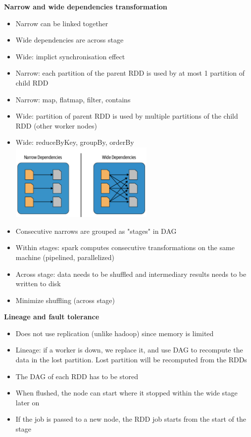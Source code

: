 \documentclass[10pt, landscape]{article}
\begin{document}
\begin{multicols}{4}
\textbf{Narrow and wide dependencies transformation}
\begin{itemize}
  \item Narrow can be linked together 
  \item Wide dependencies are across stage 
  \item Wide: implict synchronisation effect
  \item Narrow: each partition of the parent RDD is used by at most 1 partition of child RDD 
  \item Narrow: map, flatmap, filter, contains 
  \item Wide: partition of parent RDD is used by multiple partitions of the child RDD (other worker nodes)
  \item Wide: reduceByKey, groupBy, orderBy
  \includegraphics*[width=7cm]{dependencies}
  \item Consecutive narrows are grouped as "stages" in DAG
  \item Within stages: spark computes consecutive transformations on the same machine (pipelined, parallelized)
  \item Across stage: data needs to be shuffled and intermediary results needs to be written to disk
  \item Minimize shuffling (across stage)
\end{itemize}

\textbf{Lineage and fault tolerance}
\begin{itemize}
  \item Does not use replication (unlike hadoop) since memory is limited
  \item Lineage: if a worker is down, we replace it, and use DAG to recompute the data in the lost partition. Lost partition will be recomputed from the RDDs
  \item The DAG of each RDD has to be stored 
  \item When flushed, the node can start where it stopped within the wide stage later on 
  \item If the job is passed to a new node, the RDD job starts from the start of the stage
\end{itemize}


\end{multicols}
\end{document}
